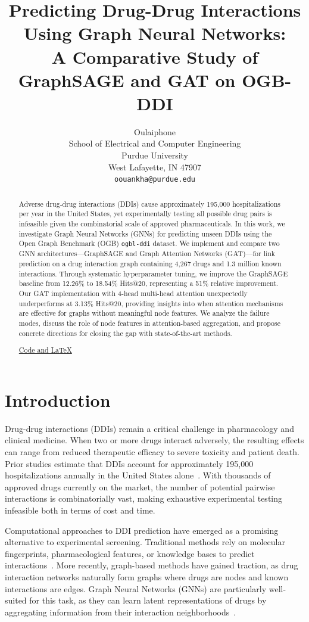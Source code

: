 \documentclass{article}
\title{Predicting Drug-Drug Interactions Using Graph Neural Networks: \\A Comparative Study of GraphSAGE and GAT on OGB-DDI}
\author{
Oulaiphone \\
School of Electrical and Computer Engineering \\
Purdue University \\
West Lafayette, IN 47907 \\
\texttt{oouankha@purdue.edu}
}
\date{}
\begin{document}
\maketitle

\begin{abstract}
Adverse drug-drug interactions (DDIs) cause approximately 195,000 hospitalizations per year in the United States, yet experimentally testing all possible drug pairs is infeasible given the combinatorial scale of approved pharmaceuticals. In this work, we investigate Graph Neural Networks (GNNs) for predicting unseen DDIs using the Open Graph Benchmark (OGB) \texttt{ogbl-ddi} dataset. We implement and compare two GNN architectures---GraphSAGE and Graph Attention Networks (GAT)---for link prediction on a drug interaction graph containing 4,267 drugs and 1.3 million known interactions. Through systematic hyperparameter tuning, we improve the GraphSAGE baseline from 12.26\% to 18.54\% Hits@20, representing a 51\% relative improvement. Our GAT implementation with 4-head multi-head attention unexpectedly underperforms at 3.13\% Hits@20, providing insights into when attention mechanisms are effective for graphs without meaningful node features. We analyze the failure modes, discuss the role of node features in attention-based aggregation, and propose concrete directions for closing the gap with state-of-the-art methods.

\href{https://github.com/oulaiphone/ece57000-ddi-gnn}{Code and LaTeX}
\end{abstract}

\section{Introduction}

Drug-drug interactions (DDIs) remain a critical challenge in pharmacology and clinical medicine. When two or more drugs interact adversely, the resulting effects can range from reduced therapeutic efficacy to severe toxicity and patient death. Prior studies estimate that DDIs account for approximately 195,000 hospitalizations annually in the United States alone~\citep{tatonetti2012data}. With thousands of approved drugs currently on the market, the number of potential pairwise interactions is combinatorially vast, making exhaustive experimental testing infeasible both in terms of cost and time.

Computational approaches to DDI prediction have emerged as a promising alternative to experimental screening. Traditional methods rely on molecular fingerprints, pharmacological features, or knowledge bases to predict interactions~\citep{vilar2014detection}. More recently, graph-based methods have gained traction, as drug interaction networks naturally form graphs where drugs are nodes and known interactions are edges. Graph Neural Networks (GNNs) are particularly well-suited for this task, as they can learn latent representations of drugs by aggregating information from their interaction neighborhoods~\citep{hamilton2017inductive}.
\end{document}
